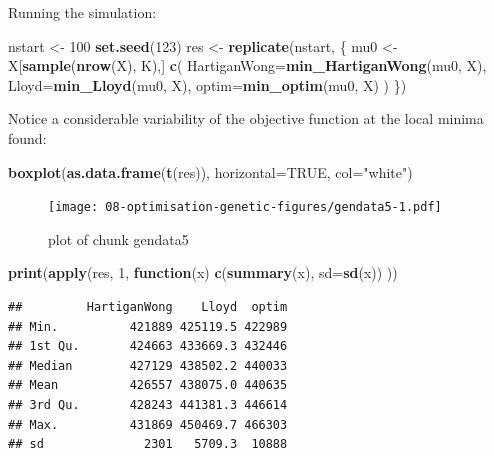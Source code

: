 \documentclass[10pt,b5paper,krantz1]{krantz}
\newenvironment{Shaded}{\begin{snugshade}}{\end{snugshade}}
\newcommand{\ControlFlowTok}[1]{\textcolor[rgb]{0.27,0.27,0.27}{\textbf{#1}}}
\newcommand{\DataTypeTok}[1]{\textcolor[rgb]{0.27,0.27,0.27}{#1}}
\newcommand{\DecValTok}[1]{\textcolor[rgb]{0.06,0.06,0.06}{#1}}
\newcommand{\KeywordTok}[1]{\textcolor[rgb]{0.27,0.27,0.27}{\textbf{#1}}}
\newcommand{\NormalTok}[1]{#1}
\newcommand{\OtherTok}[1]{\textcolor[rgb]{0.37,0.37,0.37}{#1}}
\newcommand{\StringTok}[1]{\textcolor[rgb]{0.5,0.5,0.5}{#1}}
\begin{document}
Running the simulation:

\begin{Shaded}
\begin{Highlighting}[]
\NormalTok{nstart <-}\StringTok{ }\DecValTok{100}
\KeywordTok{set.seed}\NormalTok{(}\DecValTok{123}\NormalTok{)}
\NormalTok{res <-}\StringTok{ }\KeywordTok{replicate}\NormalTok{(nstart, \{}
\NormalTok{  mu0 <-}\StringTok{ }\NormalTok{X[}\KeywordTok{sample}\NormalTok{(}\KeywordTok{nrow}\NormalTok{(X), K),]}
    \KeywordTok{c}\NormalTok{(}
        \DataTypeTok{HartiganWong=}\KeywordTok{min_HartiganWong}\NormalTok{(mu0, X),}
        \DataTypeTok{Lloyd=}\KeywordTok{min_Lloyd}\NormalTok{(mu0, X),}
        \DataTypeTok{optim=}\KeywordTok{min_optim}\NormalTok{(mu0, X)}
\NormalTok{    )}
\NormalTok{\})}
\end{Highlighting}
\end{Shaded}

Notice a considerable variability of the
objective function at the local minima found:

\begin{Shaded}
\begin{Highlighting}[]
\KeywordTok{boxplot}\NormalTok{(}\KeywordTok{as.data.frame}\NormalTok{(}\KeywordTok{t}\NormalTok{(res)), }\DataTypeTok{horizontal=}\OtherTok{TRUE}\NormalTok{, }\DataTypeTok{col=}\StringTok{"white"}\NormalTok{)}
\end{Highlighting}
\end{Shaded}

\begin{figure}
\hypertarget{fig:gendata5}{%
\centering
\texttt{[image: 08-optimisation-genetic-figures/gendata5-1.pdf]}
\caption{plot of chunk gendata5}\label{fig:gendata5}
}
\end{figure}

\begin{Shaded}
\begin{Highlighting}[]
\KeywordTok{print}\NormalTok{(}\KeywordTok{apply}\NormalTok{(res, }\DecValTok{1}\NormalTok{, }\ControlFlowTok{function}\NormalTok{(x)}
    \KeywordTok{c}\NormalTok{(}\KeywordTok{summary}\NormalTok{(x), }\DataTypeTok{sd=}\KeywordTok{sd}\NormalTok{(x))}
\NormalTok{))}
\end{Highlighting}
\end{Shaded}

\begin{verbatim}
##         HartiganWong    Lloyd  optim
## Min.          421889 425119.5 422989
## 1st Qu.       424663 433669.3 432446
## Median        427129 438502.2 440033
## Mean          426557 438075.0 440635
## 3rd Qu.       428243 441381.3 446614
## Max.          431869 450469.7 466303
## sd              2301   5709.3  10888
\end{verbatim}
\end{document}

